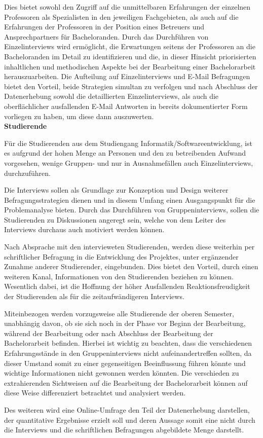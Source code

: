 \documentclass{scrreprt}
\begin{document}
\par Dies bietet sowohl den Zugriff auf die unmittelbaren Erfahrungen der einzelnen Professoren als Spezialisten in den jeweiligen Fachgebieten, als auch auf die Erfahrungen der Professoren in der Position eines Betreuers und Ansprechpartners für Bacheloranden. Durch das Durchführen von Einzelinterviews wird ermöglicht, die Erwartungen seitens der Professoren an die Bacheloranden im Detail zu identifizieren und die, in dieser Hinsicht priorisierten inhaltlichen und methodischen Aspekte bei der Bearbeitung einer Bachelorarbeit herauszuarbeiten. Die Aufteilung auf Einzelinterviews und E-Mail Befragungen bietet den Vorteil, beide Strategien simultan zu verfolgen und nach Abschluss der Datenerhebung sowohl die detaillierten Einzelinterviews, als auch die oberflächlicher ausfallenden E-Mail Antworten in bereits dokumentierter Form vorliegen zu haben, um diese dann auszuwerten.\\

\textbf{Studierende}
\par Für die Studierenden aus dem Studiengang Informatik/Softwareentwicklung, ist es aufgrund der hohen Menge an Personen und den zu betreibenden Aufwand vorgesehen, wenige Gruppen- und nur in Ausnahmefällen auch Einzelinterviews, durchzuführen. 
\par Die Interviews sollen als Grundlage zur Konzeption und Design weiterer Befragungsstrategien dienen und in diesem Umfang einen Ausgangspunkt für die Problemanalyse bieten.
Durch das Durchführen von Gruppeninterviews, sollen die Studierenden zu Diskussionen angeregt sein, welche von dem Leiter des Interviews durchaus auch motiviert werden können.
\par Nach Absprache mit den intervieweten Studierenden, werden diese weiterhin per schriftlicher Befragung in die Entwicklung des Projektes, unter ergänzender Zunahme anderer Studierender, eingebunden. Dies bietet den Vorteil, durch einen weiteren Kanal, Informationen von den Studierenden beziehen zu können. Wesentlich dabei, ist die Hoffnung der höher Ausfallenden Reaktionsfreudigkeit der Studierenden als für die zeitaufwändigeren Interviews.
\par Miteinbezogen werden vorzugsweise alle Studierende der oberen Semester, unabhängig davon, ob sie sich noch in der Phase vor Beginn der Bearbeitung, während der Bearbeitung oder nach Abschluss der Bearbeitung der Bachelorarbeit befinden. Hierbei ist wichtig zu beachten, dass die verschiedenen Erfahrungsstände in den Gruppeninterviews nicht aufeinandertreffen sollten, da dieser Umstand somit zu einer gegenseitigen Beeinflussung führen könnte und wichtige Informationen nicht gewonnen werden könnten. Die verschieden zu extrahierenden Sichtweisen auf die Bearbeitung der Bachelorarbeit können auf diese Weise differenziert betrachtet und analysiert werden.
\par Des weiteren wird eine Online-Umfrage den Teil der Datenerhebung darstellen, der quantitative Ergebnisse erzielt soll und deren Aussage somit eine nicht durch die Interviews und die schriftlichen Befragungen abgebildete Menge darstellt.
\end{document}

